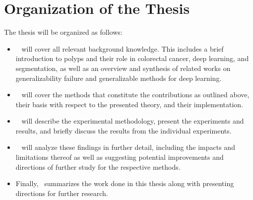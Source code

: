     
    \section{Organization of the Thesis}
    The thesis will be organized as follows:
    \begin{itemize}
        \item ~ will cover all relevant background knowledge. This includes a brief introduction to polyps and their role in colorectal cancer, deep learning, and segmentation, as well as an overview and synthesis of related works on generalizability failure and generalizable methods for deep learning.
        \item ~ will cover the methods that constitute the contributions as outlined above, their basis with respect to the presented theory, and their implementation.
        \item ~ will describe the experimental methodology, present the experiments and results, and briefly discuss the results from the individual experiments.
        \item ~ will analyze these findings in further detail, including the impacts and limitations thereof as well as suggesting potential improvements and directions of further study for the respective methods.
        \item Finally,~ summarizes the work done in this thesis along with presenting directions for further research.
    \end{itemize} 